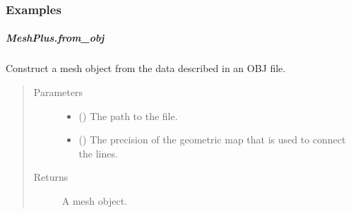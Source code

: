 \documentclass[letterpaper,10pt,english]{sphinxmanual}
\begin{document}
\begin{fulllineitems}
\begin{fulllineitems}
\begin{quote}
\begin{description}
\end{description}\end{quote}
\subsubsection*{Examples}

\begin{sphinxVerbatim}[commandchars=\\\{\}]
\end{sphinxVerbatim}

\end{fulllineitems}



\subparagraph{MeshPlus.from\_obj}
\label{\detokenize{api/generated/directional_clustering.mesh.MeshPlus.from_obj:meshplus-from-obj}}\label{\detokenize{api/generated/directional_clustering.mesh.MeshPlus.from_obj::doc}}

\begin{fulllineitems}
\label{\detokenize{api/generated/directional_clustering.mesh.MeshPlus.from_obj:directional_clustering.mesh.MeshPlus.from_obj}}
Construct a mesh object from the data described in an OBJ file.
\begin{quote}\begin{description}
\item[{Parameters}] \leavevmode\begin{itemize}
\item {} 
 () \textendash{} The path to the file.

\item {} 
 () \textendash{} The precision of the geometric map that is used to connect the lines.

\end{itemize}

\item[{Returns}] \leavevmode
{} \textendash{} A mesh object.


\end{description}
\end{quote}
\end{fulllineitems}
\end{fulllineitems}
\end{document}
